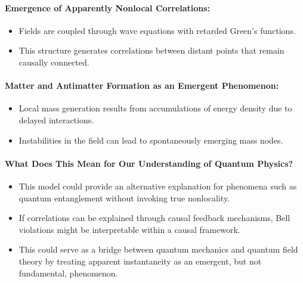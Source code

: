 \documentclass[a4paper,11pt]{article}
\begin{document}
\paragraph{Emergence of Apparently Nonlocal Correlations:}
\begin{itemize}
	\item Fields are coupled through wave equations with retarded Green’s functions.
	\item This structure generates correlations between distant points that remain causally connected.
\end{itemize}

\paragraph{Matter and Antimatter Formation as an Emergent Phenomenon:}
\begin{itemize}
	\item Local mass generation results from accumulations of energy density due to delayed interactions.
	\item Instabilities in the field can lead to spontaneously emerging mass nodes.
\end{itemize}

\paragraph{What Does This Mean for Our Understanding of Quantum Physics?}
\begin{itemize}
	\item This model could provide an alternative explanation for phenomena such as quantum entanglement without invoking true nonlocality.
	\item If correlations can be explained through causal feedback mechanisms, Bell violations might be interpretable within a causal framework.
	\item This could serve as a bridge between quantum mechanics and quantum field theory by treating apparent instantaneity as an emergent, but not fundamental, phenomenon.
\end{itemize}	
\end{document}
